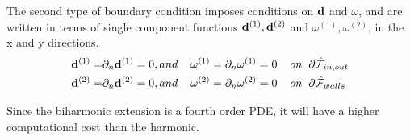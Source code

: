 The second type of boundary condition imposes conditions on $\bold{d}$ and $\omega$, and are written in terms of single component functions $\bold{d}^{(1)},\bold{d}^{(2)}$ and $\omega^{(1)}, \omega^{(2)}$, in the x and y directions.	
\begin{align}
\bold{d}^{(1)} =& \partial_n \bold{d}^{(1)} = 0 , and \hspace{4mm}   \omega^{(1)} = \partial_n \omega^{(1)} = 0    \hspace{4mm} on \hspace{2mm} \partial \hat{\mathcal{F}}_{in,out} \\
\bold{d}^{(2)} =& \partial_n \bold{d}^{(2)} = 0 , and \hspace{4mm}   \omega^{(2)} = \partial_n \omega^{(2)} = 0    \hspace{4mm} on \hspace{2mm} \partial \hat{\mathcal{F}}_{walls} \\
\end{align}

Since the biharmonic extension is a fourth order PDE, it will have a higher computational cost \cite{Richter2010} than the harmonic. 

